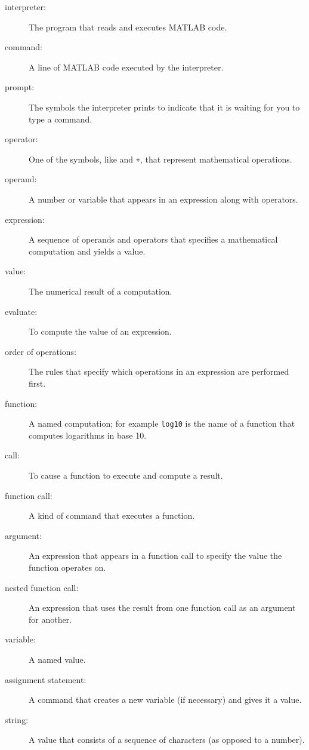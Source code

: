 \documentclass[
]{book}
\numberwithin{Answer}{chapter}
\numberwithin{Exercise}{chapter}
\begin{document}
\begin{description}

\item[interpreter:] The program that reads and executes MATLAB code.

\item[command:] A line of MATLAB code executed by the interpreter.

\item[prompt:] The symbols the interpreter prints to indicate that it is
waiting for you to type a command.

\item[operator:] One of the symbols, like {\tt *} and {\tt +}, that
represent mathematical operations.

\item[operand:] A number or variable that appears in an expression along
with operators.

\item[expression:] A sequence of operands and operators that specifies
a mathematical computation and yields a value.

\item[value:] The numerical result of a computation.

\item[evaluate:] To compute the value of an expression.

\item[order of operations:] The rules that specify which operations
in an expression are performed first.

\item[function:] A named computation; for example {\tt log10} is the
name of a function that computes logarithms in base 10.

\item[call:] To cause a function to execute and compute a result.

\item[function call:] A kind of command that executes a function.

\item[argument:] An expression that appears in a function call to
specify the value the function operates on.

\item[nested function call:] An expression that uses the result from
one function call as an argument for another.

\item[variable:] A named value.

\item[assignment statement:] A command that creates a new variable
(if necessary) and gives it a value.

\item[string:] A value that consists of a sequence of characters (as
opposed to a number).


\end{description}
\end{document}
